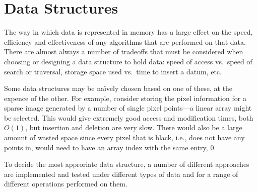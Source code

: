 
\part{Data Structures}
\label{prt:data_structures}

The way in which data is represented in memory has a large effect on the speed,
efficiency and effectiveness of any algorithms that are performed on that data.
There are almost always a number of tradeoffs that must be considered when
choosing or designing a data structure to hold data: speed of access vs.\ speed
of search or traversal, storage space used vs.\ time to insert a datum, etc.

Some data structures may be na\"ively chosen based on one of these, at the
expence of the other. For example, consider storing the pixel information for a
sparse image generated by a number of single pixel points---a linear array
might be selected. This would give extremely good access and modification
times, both $O(1)$, but insertion and deletion are very slow. There would also
be a large amount of wasted space since every pixel that is black, i.e., does
not have any points in, would need to have an array index with the same entry,
$0$.

To decide the most approriate data structure, a number of different approaches
are implemented and tested under different types of data and for a range of
different operations performed on them.
